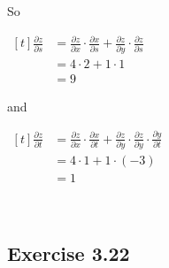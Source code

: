 {~~~}

{~~~}

So \begin{minipage}[t]{0.3\linewidth}
    $\begin{aligned}[t]
        \frac{\partial z}{\partial s} 
         & = \frac{\partial z}{\partial x} \cdot \frac{\partial x}{\partial s} + \frac{\partial z}{\partial y} \cdot \frac{\partial z}{\partial s} \\
         & = 4 \cdot 2 + 1 \cdot 1 \\
         & = 9
    \end{aligned}$
\end{minipage} and \qquad\begin{minipage}[t]{0.33\linewidth}
    $\begin{aligned}[t]
        \frac{\partial z}{\partial t}
         & = \frac{\partial z}{\partial x} \cdot \frac{\partial x}{\partial t} + \frac{\partial z}{\partial y} \cdot \frac{\partial z}{\partial y} \cdot \frac{\partial y}{\partial t} \\
         & = 4 \cdot 1 + 1 \cdot (-3) \\
         & = 1
    \end{aligned}$
\end{minipage}

{~~~}

\subsection*{Exercise 3.22}


